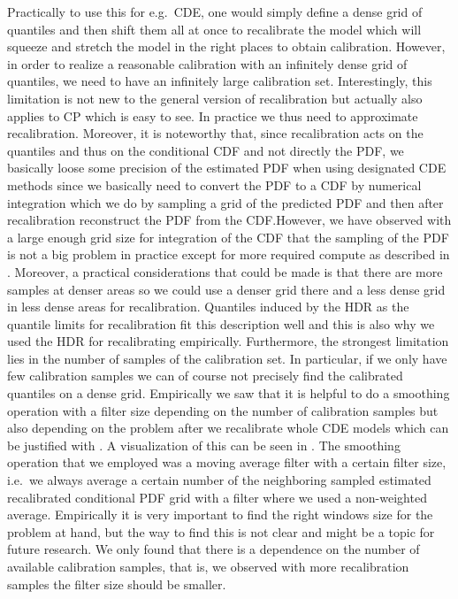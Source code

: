Practically to use this for e.g.\ CDE, one would simply define a dense grid of quantiles and then shift them all at once to recalibrate the model which will squeeze and stretch the model in the right places to obtain calibration. However, in order to realize a reasonable calibration with an infinitely dense grid of quantiles, we need to have an infinitely large calibration set. Interestingly, this limitation is not new to the general version of recalibration but actually also applies to CP which is easy to see. In practice we thus need to approximate recalibration. Moreover, it is noteworthy that, since recalibration acts on the quantiles and thus on the conditional CDF and not directly the PDF, we basically loose some precision of the estimated PDF when using designated CDE methods since we basically need to convert the PDF to a CDF by numerical integration which we do by sampling a grid of the predicted PDF and then after recalibration reconstruct the PDF from the CDF.\@ However, we have observed with a large enough grid size for integration of the CDF that the sampling of the PDF is not a big problem in practice except for more required compute as described in . Moreover, a practical considerations that could be made is that there are more samples at denser areas so we could use a denser grid there and a less dense grid in less dense areas for recalibration. Quantiles induced by the HDR as the quantile limits for recalibration fit this description well and this is also why we used the HDR for recalibrating empirically. Furthermore, the strongest limitation lies in the number of samples of the calibration set. In particular, if we only have few calibration samples we can of course not precisely find the calibrated quantiles on a dense grid. Empirically we saw that it is helpful to do a smoothing operation with a filter size depending on the number of calibration samples but also depending on the problem after we recalibrate whole CDE models which can be justified with . A visualization of this can be seen in . The smoothing operation that we employed was a moving average filter with a certain filter size, i.e.\ we always average a certain number of the neighboring sampled estimated recalibrated conditional PDF grid with a filter where we used a non-weighted average. Empirically it is very important to find the right windows size for the problem at hand, but the way to find this is not clear and might be a topic for future research. We only found that there is a dependence on the number of available calibration samples, that is, we observed with more recalibration samples the filter size should be smaller.

